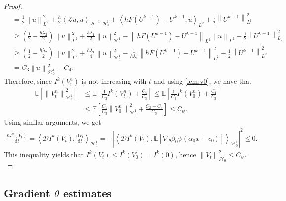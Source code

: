 \documentclass[11pt,a4paper,reqno]{amsart}
\numberwithin{equation}{section}
\theoremstyle{plain}
\theoremstyle{definition}
\def\ud{\mathrm d}
\newcommand{\ip}[1]{\left\langle#1\right\rangle}
\newcommand{\E}{\mathbb{E}}
\newcommand{\cL}{\mathcal{L}}
\newcommand{\cH}{\mathcal{H}}
\newcommand{\norm}[1]{\left\|#1 \right\|} %
\newcommand{\abs}[1]{\left|#1\right|} %
\begin{document}
\begin{proof}
\begin{align*}
    &= \frac{1}{2}\norm{u}^2_{L^2}+ \frac{h}{2}\ip{\cL u,u}_{\cH^{-1},\cH_0^1} + \ip{hF \left( U^{k - 1}\right) -U^{k-1}, u}_{L^2}+\frac{1}{2}\norm{U^{k-1}}_{L^2}^2\\ 
    &\geq \left( \frac{1}{2} - \frac{h \lambda_2}{2} \right) \norm{u}^2_{L^2} + \frac{h \lambda_1}{2} \norm{ u}_{\cH_0^1}^2 - \norm{h F \left( U^{k - 1} \right) - U^{k - 1}}_{L^2} \norm{u}_{L^2} -\frac{1}{2} \norm{U^{k - 1}}_{L_2}^2 \\
    &\geq \left( \frac{1}{2} - \frac{h \lambda_2}{2} \right) \norm{u}^2_{L^2} + \frac{h \lambda_1}{4} \norm{ u}_{\cH_0^1}^2 - \frac{1}{h\lambda_1} \norm{h F \left( U^{k - 1} \right) - U^{k - 1}}_{L^2}^2  -\frac{1}{2} \norm{U^{k - 1}}_{L^2}^2\\
    &= C_3 \norm{u}_{\cH_0^1 }^2 - C_4.
 \end{align*}
Therefore, since $I^k \left( V_t^n \right)$ is not increasing with $t$ and using \cref{lem:v0}, we have that
\begin{align*}
\E \left[ \norm{V^n_t}_{\cH_0^1}^2 \right] 
    &\leq \E \left[ \frac{1}{C_3} I^k \left( V^n_t \right) + \frac{C_4}{C_3} \right] 
     \leq \E \left[ \frac{1}{C_3} I^k \left( V_0^n \right) + \frac{C_4}{C_3} \right] \\
    &\leq \E \left[ \frac{C_1}{C_3} \norm{V^n_0}_{\cH_0^1 }^2 + \frac{C_2 + C_4}{C_3} \right] 
     \leq C_{\psi}.
\end{align*}
Using similar arguments, we get
\begin{align*}
\frac{\ud I^k \left( V_t \right)}{\ud t} 
    = \ip{\mathcal{D} I^k \left( V_t \right), \frac{\ud V_t}{\ud t}}_{\cH_0^1} 
    = - \abs{\ip{\mathcal{D} I^k \left( V_t \right), \E\left[\nabla _\theta\beta_0 \psi \left( \alpha_0 x + c_0 \right)\right]}_{\cH_0^1}}^2
    \le 0.
\end{align*}
This inequality yields that $ I^k \left( V_t \right)\le I^k \left( V_0 \right)=I^k \left( 0 \right)$, hence $\norm{V_t}^2_{\cH_0^1} \le  C_\psi.$
\end{proof}


\subsection{Gradient \texorpdfstring{$\theta$}{θ} estimates}
\end{document}
